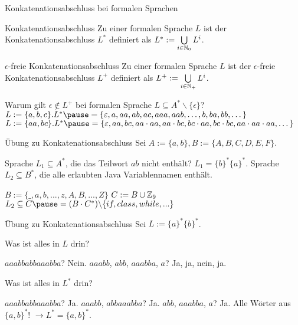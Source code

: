\documentclass{beamer}
\begin{document}
\begin{frame}{Konkatenationsabschluss bei formalen Sprachen}
	\p
	\begin{block}{Konkatenationsabschluss}
		Zu einer formalen Sprache $L$ ist der Konkatenationsabschluss $L^*$ definiert als \pause $L^* := \bigcup\limits_{i \in \mathbb{N}_0} L^i$.
	\end{block}
	\p
	\begin{block}{$\epsilon$-freie Konkatenationsabschluss}
		Zu einer formalen Sprache $L$ ist der $\epsilon$-freie Konkatenationsabschluss $L^+$ definiert als \pause $L^+ := \bigcup\limits_{i \in \mathbb{N}_+} L^i$.
	\end{block}

	\begin{itemize}
		\pitem Warum gilt $\epsilon \notin L^+$ bei formalen Sprache $L \subseteq A^* \backslash \{\epsilon\}$?
		\pitem $L := \{a, b, c\}.  L^* \pause = \{\epsilon, a, aa, ab, ac, aaa, aab, \dots, b, ba, bb, \dots \}$
		\pitem $L := \{aa, bc\}.  L^* \pause = \{\epsilon, aa, bc, aa\cdot aa, aa\cdot bc, bc \cdot aa, bc \cdot bc, aa \cdot aa \cdot aa, \dots \}$
	\end{itemize}
\end{frame}

\begin{frame}{Übung zu Konkatenationsabschluss}
	Sei $A := \{a, b\}, B := \{A, B, C, D, E, F\}$.
	\begin{itemize}
		\pitem Sprache $L_1 \subseteq A^*$, die das Teilwort $ab$ nicht enthält? \pause $L_1 = \{b\}^*\{a\}^*$.
		\pitem Sprache $L_2 \subseteq B^*$, die alle erlaubten Java Variablennamen enthält.
		\begin{itemize}
			\pitem $B := \{\_,a,b,...,z,A,B,...,Z\}$
			\pitem $C := B \cup \mathbb{Z}_9$
			\pitem $L_2 \subseteq C \pause = (B \cdot C^*) \backslash \{if, class, while, ...\}$
		\end{itemize}
	\end{itemize}
\end{frame}

\begin{frame}{Übung zu Konkatenationsabschluss}
	\pause Sei $L := \{a\}^*\{b\}^*$.
	\begin{itemize}
		\pitem Was ist alles in $L$ drin?
		\begin{itemize}
			\pitem $aaabbabbaaabba$? \pause Nein.
			\pitem $aaabb$, $abb$, $aaabba$, $a$? \pause Ja, ja, nein, ja.
		\end{itemize}
		\pitem Was ist alles in $L^*$ drin?
		\begin{itemize}
			\pitem $aaabbabbaaabba$? \pause Ja.
			\pitem $aaabb$, $abbaaabba$? \pause Ja.
			\pitem $abb$, $aaabba$, $a$? \pause Ja.
			\pitem Alle Wörter aus $\{a,b\}^*$! \pause $\rightarrow L^* = \{a,b\}^*$.
		\end{itemize}
	\end{itemize}
\end{frame}
\end{document}
